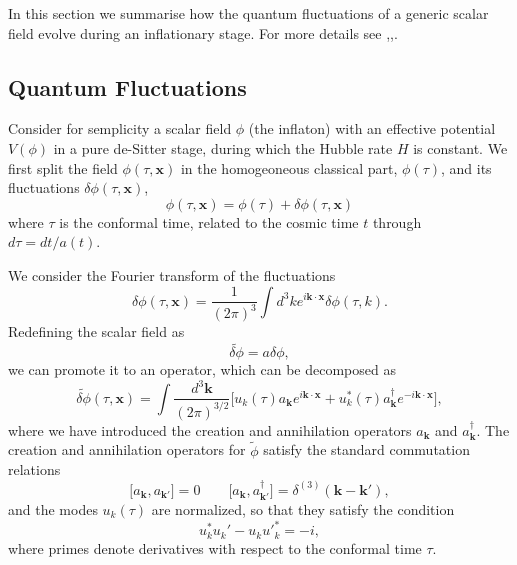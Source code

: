 \documentclass[11pt,a4paper,twoside]{book}
\begin{document}
In this section we summarise how the quantum fluctuations of a generic scalar field evolve during an inflationary stage. For more details see \cite{Liddle:intro},\cite{NonGauss:Intro},\cite{Dodelson:Chap1}.

\subsection{Quantum Fluctuations}
Consider for semplicity a scalar field $ \phi $ (the inflaton) with an effective potential $ V(\phi) $ in a pure de-Sitter stage, during which the Hubble rate $ H $ is constant. 
We first split the field $ \phi(\tau,\textbf{x}) $ in the homogeoneous classical part, $ \phi(\tau) $, and its fluctuations $ \delta\phi(\tau,\textbf{x}) $,
\begin{equation}
	\label{splitInflatonTau}
	\phi(\tau,\textbf{x})=\phi(\tau) + \delta \phi(\tau,\textbf{x})
\end{equation}
where $ \tau $ is the conformal time, related to the cosmic time $ t $ through $ d\tau=dt/a(t) $.

We consider the Fourier transform of the fluctuations
\begin{equation}
\label{fourierTransform}
\delta\phi(\tau,\textbf{x})=\frac{1}{(2\pi)^{3}}\int d^{3}k e^{i \textbf{k}\cdot\textbf{x}}\delta\phi(\tau,k).
\end{equation}
Redefining  the scalar field as 
\begin{equation}
\label{fieldRedefinition}
\widetilde{\delta \phi}	= a\delta\phi,
\end{equation}
 we can promote it to an operator, which can be decomposed as 
 \begin{equation}
 	\label{quantitation}
 	\widetilde{\delta \phi}(\tau,\textbf{x})=\int \frac{d^{3} \textbf{k}}{(2\pi)^{3/2}} \big[u_{k}(\tau)a_{\textbf{k}}e^{i \textbf{k}\cdot\textbf{x}} + u_{k}^{*}(\tau)a_{\textbf{k}}^{\dagger}e^{-i \textbf{k}\cdot\textbf{x}}\big],
 \end{equation}
 where we have introduced the creation and annihilation operators $ a_{\textbf{k}} $ and $ a^{\dagger}_{\textbf{k}} $.
 The creation and annihilation operators for $\tilde{\phi}$ satisfy the standard commutation relations
 \begin{equation}
 	\label{commutationRelations}
 \big[a_{\textbf{k}},a_{\textbf{k}'}] = 0 \qquad \big[a_{\textbf{k}},a_{\textbf{k}'}^{\dagger}] = \delta^{(3)}(\textbf{k}-\textbf{k}'),
 \end{equation}
and the modes $ u_{k}(\tau) $ are normalized, so that they satisfy the condition
\begin{equation}
	\label{normalitation}
	u^{\ast}_{k} u_{k}' - u_{k} u'^{\ast}_{k} = -i,
\end{equation}
where primes denote derivatives with respect to the conformal time $ \tau $. 
\end{document}
